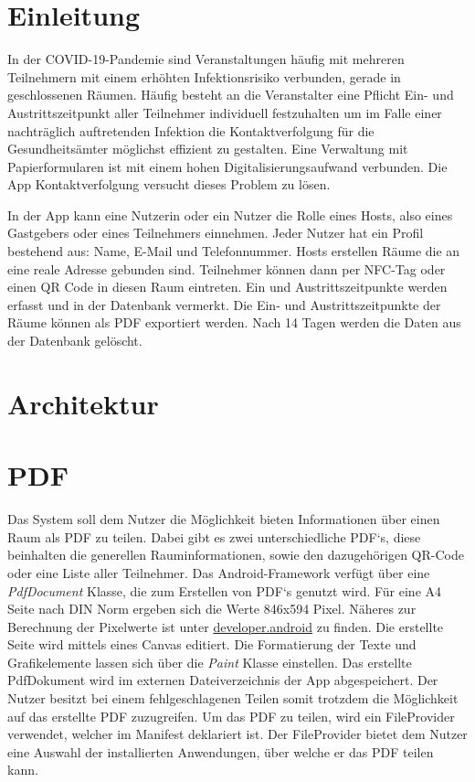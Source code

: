 \sloppy
\section{Einleitung}
\label{sec:Einleitung}
In der COVID-19-Pandemie sind Veranstaltungen häufig mit mehreren Teilnehmern mit einem erhöhten Infektionsrisiko verbunden, gerade in geschlossenen Räumen.
Häufig besteht an die Veranstalter eine Pflicht Ein- und Austrittszeitpunkt aller Teilnehmer individuell festzuhalten um im Falle einer nachträglich auftretenden Infektion die Kontaktverfolgung für die Gesundheitsämter möglichst effizient zu gestalten.
Eine Verwaltung mit Papierformularen ist mit einem hohen Digitalisierungsaufwand verbunden.
Die App Kontaktverfolgung versucht dieses Problem zu lösen.

In der App kann eine Nutzerin oder ein Nutzer die Rolle eines Hosts, also eines Gastgebers oder eines Teilnehmers einnehmen. Jeder Nutzer hat ein Profil bestehend aus: Name, E-Mail und Telefonnummer.
Hosts erstellen Räume die an eine reale Adresse gebunden sind. Teilnehmer können dann per NFC-Tag oder einen QR Code in diesen Raum eintreten. Ein und Austrittszeitpunkte werden erfasst und in der Datenbank vermerkt.
Die Ein- und Austrittszeitpunkte der Räume können als PDF exportiert werden.
Nach 14 Tagen werden die Daten aus der Datenbank gelöscht.
\section{Architektur}
\label{sec:Architektur}
\section{PDF}
\label{sec:PDF}
Das System soll dem Nutzer die Möglichkeit bieten Informationen über einen Raum als PDF zu teilen. Dabei gibt es zwei unterschiedliche PDF‘s, diese beinhalten die generellen Rauminformationen, sowie den dazugehörigen QR-Code oder eine Liste aller Teilnehmer.
Das Android-Framework  verfügt über eine \textit{PdfDocument} Klasse, die zum Erstellen von PDF‘s genutzt wird. Für eine A4 Seite nach DIN Norm ergeben sich die Werte 846x594 Pixel. Näheres zur Berechnung der Pixelwerte ist unter \href{https://developer.android.com/reference/android/graphics/pdf/PdfDocument.PageInfo}{developer.android} zu finden. Die erstellte Seite wird mittels eines Canvas editiert. Die Formatierung  der Texte und Grafikelemente lassen sich über die \textit{Paint} Klasse einstellen.
Das erstellte PdfDokument wird im externen Dateiverzeichnis der App abgespeichert. Der Nutzer besitzt bei einem fehlgeschlagenen Teilen somit trotzdem die Möglichkeit auf das erstellte PDF zuzugreifen.
Um das PDF zu teilen, wird ein FileProvider verwendet, welcher im Manifest deklariert ist.  Der FileProvider bietet dem Nutzer eine Auswahl der installierten Anwendungen, über welche er das PDF teilen kann.


